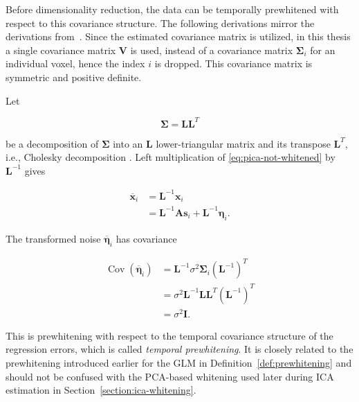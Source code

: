 \documentclass[english]{pwr_wmat_praca_dyplomowa}
\theoremstyle{definition}
\theoremstyle{remark}
\begin{document}
Before dimensionality reduction, the data can be temporally prewhitened with respect to this covariance structure. The following derivations mirror the derivations from~\cite{pica}. Since the estimated covariance matrix is utilized, in this thesis a single covariance matrix $\mathbf{V}$ is used, instead of a covariance matrix $\boldsymbol{\Sigma}_i$ for an individual voxel, hence the index $i$ is dropped. This covariance matrix is symmetric and positive definite.

\newpage
Let

\begin{equation}
    \boldsymbol{\Sigma} = \mathbf{L}\mathbf{L}^T
\end{equation}

be a decomposition of $\boldsymbol{\Sigma}$ into an $\mathbf{L}$ lower-triangular matrix and its transpose $\mathbf{L}^T$, i.e., Cholesky decomposition \cite{cholesky}. Left multiplication of \eqref{eq:pica-not-whitened} by $\mathbf{L}^{-1}$ gives

\begin{equation}
    \begin{aligned}
        \overline{\mathbf{x}}_i
        &= \mathbf{L}^{-1}\mathbf{x}_i \\
        &= \mathbf{L}^{-1}\mathbf{A}\mathbf{s}_i + \mathbf{L}^{-1}\boldsymbol{\eta}_i.
    \end{aligned}
    \label{eq:pica-temporal-whitening}
\end{equation}

The transformed noise $\overline{\boldsymbol{\eta}}_i$ has covariance

\begin{equation}
    \begin{aligned}
        \operatorname{Cov} \left(\overline{\boldsymbol{\eta}}_i\right)
        &= \mathbf{L}^{-1} \sigma^2\boldsymbol{\Sigma}_i \left(\mathbf{L}^{-1}\right)^T \\
        &= \sigma^2 \mathbf{L}^{-1} \mathbf{L} \mathbf{L}^T \left(\mathbf{L}^{-1}\right)^T \\
        &= \sigma^2\mathbf{I}.
    \end{aligned}
\end{equation}

This is prewhitening with respect to the temporal covariance structure of the regression errors, which is called \textit{temporal prewhitening}. It is closely related to the prewhitening introduced earlier for the GLM in Definition~\ref{def:prewhitening} and should not be confused with the PCA-based whitening used later during ICA estimation in Section~\ref{section:ica-whitening}.
\end{document}
